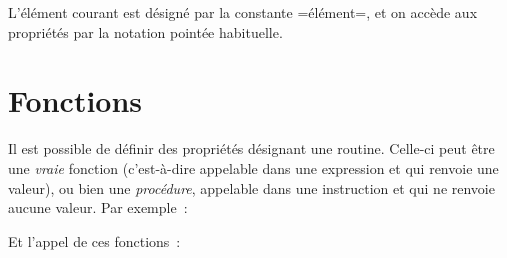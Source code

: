 L'élément courant est désigné par la constante \plm=élément=, et on accède aux propriétés par la notation pointée habituelle. 








\section{Fonctions}

Il est possible de définir des propriétés désignant une routine. Celle-ci peut être une \emph{vraie} fonction (c'est-à-dire appelable dans une expression et qui renvoie une valeur), ou bien une \emph{procédure}, appelable dans une instruction et qui ne renvoie aucune valeur. Par exemple~:


Et l'appel de ces fonctions~:



